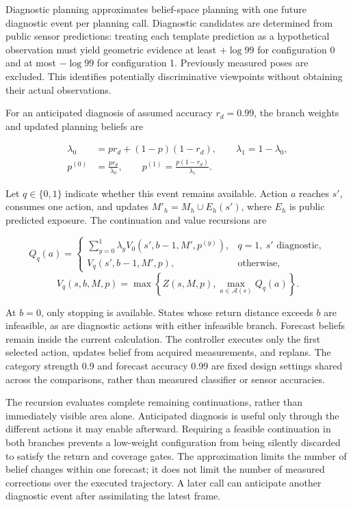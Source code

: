 \documentclass[11pt,a4paper]{article}
\begin{document}
Diagnostic planning approximates belief-space planning \cite{ref12,ref13} with one future diagnostic event per planning call. Diagnostic candidates are determined from public sensor predictions: treating each template prediction as a hypothetical observation must yield geometric evidence at least \(+\log99\) for configuration 0 and at most \(-\log99\) for configuration 1. Previously measured poses are excluded. This identifies potentially discriminative viewpoints without obtaining their actual observations.

For an anticipated diagnosis of assumed accuracy \(r_d=0.99\), the branch weights and updated planning beliefs are

\[
\begin{aligned}
\lambda_0&=pr_d+(1-p)(1-r_d),\qquad \lambda_1=1-\lambda_0,\\
p^{(0)}&=\frac{pr_d}{\lambda_0},\qquad
p^{(1)}=\frac{p(1-r_d)}{\lambda_1}.
\end{aligned}
\]

Let \(q\in\{0,1\}\) indicate whether this event remains available. Action \(a\) reaches \(s'\), consumes one action, and updates \(M'_h=M_h\cup E_h(s')\), where \(E_h\) is public predicted exposure. The continuation and value recursions are

\[
Q_q(a)=
\begin{cases}
\sum_{y=0}^{1}\lambda_y V_0(s',b-1,M',p^{(y)}),
&q=1,\ s'\text{ diagnostic},\\
V_q(s',b-1,M',p),&\text{otherwise},
\end{cases}
\] \[
V_q(s,b,M,p)=\max\left\{Z(s,M,p),\max_{a\in\mathcal A(s)}Q_q(a)\right\}.
\]

At \(b=0\), only stopping is available. States whose return distance exceeds \(b\) are infeasible, as are diagnostic actions with either infeasible branch. Forecast beliefs remain inside the current calculation. The controller executes only the first selected action, updates belief from acquired measurements, and replans. The category strength 0.9 and forecast accuracy 0.99 are fixed design settings shared across the comparisons, rather than measured classifier or sensor accuracies.

The recursion evaluates complete remaining continuations, rather than immediately visible area alone. Anticipated diagnosis is useful only through the different actions it may enable afterward. Requiring a feasible continuation in both branches prevents a low-weight configuration from being silently discarded to satisfy the return and coverage gates. The approximation limits the number of belief changes within one forecast; it does not limit the number of measured corrections over the executed trajectory. A later call can anticipate another diagnostic event after assimilating the latest frame.
\end{document}
